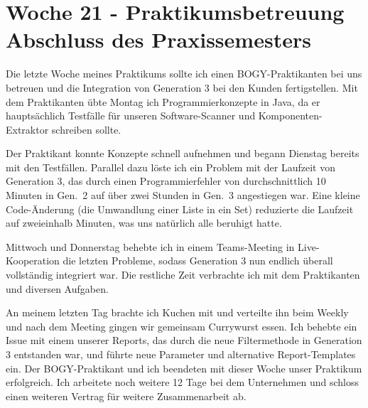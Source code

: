 \section{Woche 21 - Praktikumsbetreuung \headerand Abschluss des Praxissemesters} \label{sec:bericht-wo-21}


\lweekdaymarginpar{\weekdayMondayLong}

Die letzte Woche meines Praktikums sollte ich einen BOGY-Praktikanten bei uns betreuen und die Integration von Generation 3 bei den Kunden fertigstellen.
Mit dem Praktikanten übte Montag ich Programmierkonzepte in Java, da er hauptsächlich Testfälle für unseren Software-Scanner und Komponenten-Extraktor schreiben sollte.

\sweekdaymarginpar{\weekdayTuesdayLong}

Der Praktikant konnte Konzepte schnell aufnehmen und begann Dienstag bereits mit den Testfällen.
Parallel dazu löste ich ein Problem mit der Laufzeit von Generation 3, das durch einen Programmierfehler von durchschnittlich 10 Minuten in Gen.\ 2 auf über zwei Stunden in Gen.\ 3 angestiegen war.
Eine kleine Code-Änderung (die Umwandlung einer Liste in ein Set) reduzierte die Laufzeit auf zweieinhalb Minuten, was uns natürlich alle beruhigt hatte.

\sweekdaymarginpar{\weekdayWednesdayShort, \weekdayThursdayShort}

Mittwoch und Donnerstag behebte ich in einem Teams-Meeting in Live-Kooperation die letzten Probleme, sodass Generation 3 nun endlich überall vollständig integriert war.
Die restliche Zeit verbrachte ich mit dem Praktikanten und diversen Aufgaben.

\sweekdaymarginpar{\weekdayFridayLong}

An meinem letzten Tag brachte ich Kuchen mit und verteilte ihn beim Weekly und nach dem Meeting gingen wir gemeinsam Currywurst essen.
Ich behebte ein Issue mit einem unserer Reports, das durch die neue Filtermethode in Generation 3 entstanden war, und führte neue Parameter und alternative Report-Templates ein.
Der BOGY-Praktikant und ich beendeten mit dieser Woche unser Praktikum erfolgreich.
Ich arbeitete noch weitere 12 Tage bei dem Unternehmen und schloss einen weiteren Vertrag für weitere Zusammenarbeit ab.

